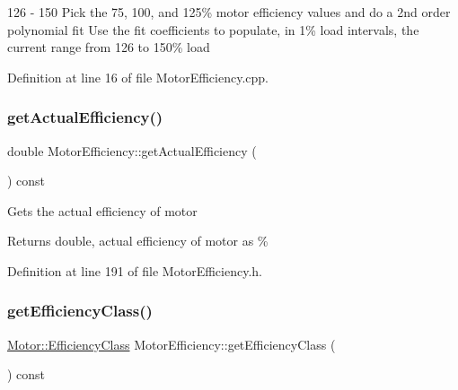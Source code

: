 126 -\/ 150 Pick the 75, 100, and 125\% motor efficiency values and do a 2nd order polynomial fit Use the fit coefficients to populate, in 1\% load intervals, the current range from 126 to 150\% load

Definition at line 16 of file Motor\+Efficiency.\+cpp.

\mbox{\label{class_motor_efficiency_ae40031307b8631cf40df1c4069069dc0}} 
\subsubsection{\texorpdfstring{get\+Actual\+Efficiency()}{getActualEfficiency()}}
{\footnotesize\ttfamily double Motor\+Efficiency\+::get\+Actual\+Efficiency (\begin{DoxyParamCaption}{ }\end{DoxyParamCaption}) const\hspace{0.3cm}{\ttfamily [inline]}}

Gets the actual efficiency of motor

\begin{DoxyReturn}{Returns}
double, actual efficiency of motor as \% 
\end{DoxyReturn}


Definition at line 191 of file Motor\+Efficiency.\+h.

\mbox{\label{class_motor_efficiency_a9eb7d5c2fc598f655c1a3d12790e4d17}} 
\subsubsection{\texorpdfstring{get\+Efficiency\+Class()}{getEfficiencyClass()}}
{\footnotesize\ttfamily \hyperlink{class_motor_afa022971ae062406a9f588c601673d4e}{Motor\+::\+Efficiency\+Class} Motor\+Efficiency\+::get\+Efficiency\+Class (\begin{DoxyParamCaption}{ }\end{DoxyParamCaption}) const\hspace{0.3cm}{\ttfamily [inline]}}

